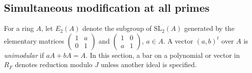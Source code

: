 \documentclass[11pt]{amsart}
\theoremstyle{definition}
\theoremstyle{remark}
\begin{document}
\subsection{Simultaneous modification at all primes}
For a ring $A$, let $E_2(A)$ denote the subgroup of
$\mathrm{SL}_2(A)$ generated by the elementary matrices
$\left(\begin{smallmatrix}1&a\\0&1\end{smallmatrix}\right)$ and
$\left(\begin{smallmatrix}1&0\\a&1\end{smallmatrix}\right)$,
$a\in A$. A vector $(a,b)^t$ over $A$ is \emph{unimodular} if
$aA+bA=A$. In this section, a bar on a polynomial or vector
in $R_F$ denotes reduction modulo $J$ unless another ideal
is specified.
\end{document}
